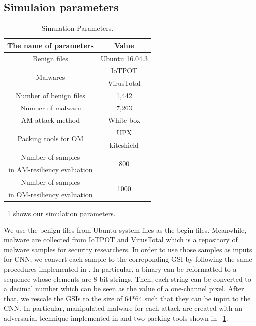 \documentclass{ieeeaccess}
\begin{document}
\subsection{Simulaion parameters}
\begin{table}[h]
	\begin{center}
		\caption{Simulation Parameters.}
		\label{tab:simulation_parameters} 
		\begin{tabular}{|c|c|} \hline
			The name of parameters & Value\\ \hline \hline
			Benign files & Ubuntu 16.04.3\cite{ubuntu}\\ \hline
			\multirow{2}{*}{\hfill Malwares  \hfill} & IoTPOT\cite{iotpot} \\ 
																							 & VirusTotal\cite{virustotal}\\ \hline
			Number of benign files  & 1,442 \\  \hline
			Number of malware  &  7,263 \\ \hline
			AM attack method & White-box \cite{am, yamafumi} \\ \hline
			\multirow{2}{*}{\hfill Packing tools for OM  \hfill} & UPX\cite{upx} \\ & kiteshield\cite{kiteshield} \\ \hline
			Number of samples  & \multirow{2}{*}{\hfill 800 \hfill} \\  
			in AM-resiliency evaluation & \\ \hline 
			Number of samples  & \multirow{2}{*}{\hfill 1000 \hfill} \\  
			in OM-resiliency evaluation & \\ \hline 
		\end{tabular}
	\end{center}
\end{table} 

\tablename~\ref{tab:simulation_parameters} shows our simulation parameters.  

We use the benign files from Ubuntu system files \cite{ubuntu} as the begin files.
Meanwhile, malware are collected from IoTPOT \cite{iotpot} and VirusTotal \cite{virustotal} which is a repository of malware samples for security researchers.
In order to use those samples as inputs for CNN, we convert each sample to the correponding GSI by following the same procedures implemented in \cite{previous}.
In particular, a binary can be reformatted to a sequence whose elements are 8-bit strings.
Then, each string can be converted to a decimal number which can be seen as the value of a one-channel pixel.
After that, we rescale the GSIs to the size of 64*64 such that they can be input to the CNN.
In particular, manipulated malware for each attack are created with an adversarial technique implemented in \cite{am, yamafumi} and two packing tools \cite{upx, kiteshield} shown in \tablename~\ref{tab:simulation_parameters}.
\end{document}

